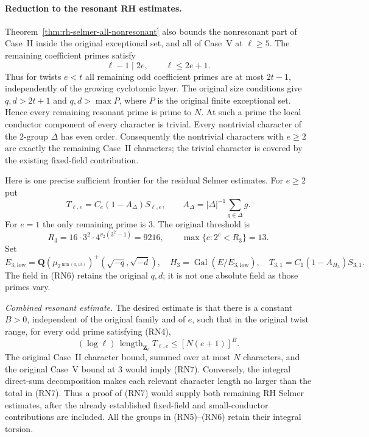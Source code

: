 \paragraph{Reduction to the resonant RH estimates.}
Theorem~\ref{thm:rh-selmer-all-nonresonant} also bounds
the nonresonant part of Case~II inside the original
exceptional set, and all of Case~V at $\ell\ge5$.
The remaining coefficient primes satisfy
\[
                        \ell-1\mid2e,
               \qquad \ell\le2e+1.                           \tag{RN4}
\]
Thus for twists $e<t$ all remaining odd coefficient
primes are at most $2t-1$, independently of the growing
cyclotomic layer.  The original size conditions give
$q,d>2t+1$ and $q,d>\max P$, where $P$ is the original
finite exceptional set\cite{rh-selmer-nonresonant-source}.
Hence every remaining resonant
prime is prime to $N$.  At such a prime the local conductor
component of every character is trivial.  Every nontrivial
character of the $2$-group $\Delta$ has even order.
Consequently the nontrivial characters with $e\ge2$
are exactly the remaining Case~II characters; the trivial
character is covered by the existing fixed-field contribution.

Here is one precise sufficient frontier for the residual
Selmer estimates.  For $e\ge2$ put
\[
       T_{\ell,e}=C_e(1-A_\Delta)S_{\ell,e},\qquad
       A_\Delta=|\Delta|^{-1}\sum_{g\in\Delta}g.              \tag{RN5}
\]
For $e=1$ the only remaining prime is $3$.  The original
threshold is
\[
 R_3=16\cdot3^2\cdot4^{v_2(3^2-1)}=9216,
       \qquad \max\{c:2^c<R_3\}=13.
\]
Set
\[
 E_{3,\mathrm{low}}=
       \mathbf Q(\mu_{2^{\min(a,13)}})^+(\sqrt{-q},\sqrt{-d}),
 \quad H_3=\operatorname{Gal}(E/E_{3,\mathrm{low}}),
 \quad T_{3,1}=C_1(1-A_{H_3})S_{3,1}.                         \tag{RN6}
\]
The field in (RN6) retains the original $q,d$; it is not
one absolute field as those primes vary.

\emph{Combined resonant estimate.}  The desired estimate is that there is a constant
$B>0$, independent of the original family and of $e$,
such that in the original twist range, for every odd
prime satisfying (RN4),
\[
             (\log\ell)\,
             \operatorname{length}_{\mathbf Z_\ell}T_{\ell,e}
                         \le[N(e+1)]^B.                      \tag{RN7}
\]
The original Case~II character bound, summed over at most
$N$ characters, and the original Case~V bound at $3$
would imply (RN7).  Conversely, the integral direct-sum
decomposition makes each relevant character length no
larger than the total in (RN7).  Thus a proof of (RN7)
would supply both remaining RH Selmer estimates, after
the already established fixed-field and small-conductor
contributions are included.  All the groups in (RN5)--(RN6)
retain their integral torsion.

